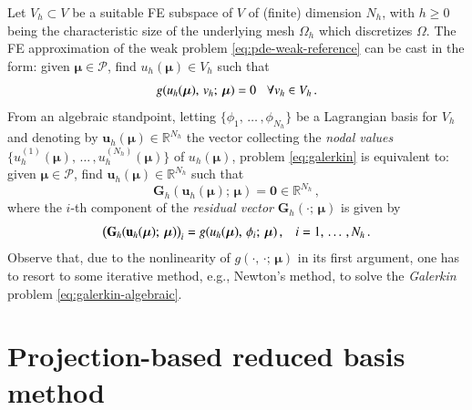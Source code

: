 \documentclass[longtitle]{elsarticle}
\numberwithin{equation}{section}
\theoremstyle{theorem}
\theoremstyle{definition}
\theoremstyle{remark}
\theoremstyle{proposition}
\numberwithin{figure}{section}
\newcommand{\bg}[1]{\boldsymbol{#1}}
\begin{document}
		Let $V_h \subset V$ be a suitable FE subspace of $V$ of (finite) dimension $N_h$, with $h \geq 0$ being the characteristic size of the underlying mesh $\Omega_h$ which discretizes $\Omega$. The FE approximation of the weak problem \eqref{eq:pde-weak-reference} can be cast in the form: given $\bg{\mu} \in \mathcal{P}$, find $u_h(\bg{\mu}) \in V_h$ such that 
		\begin{equation}
			\label{eq:galerkin}
			g(u_h(\bg{\mu}), \, v_h; \, \bg{\mu}) = 0 \hspace*{0.3cm} \forall v_h \in V_h \, .
		\end{equation}
		From an algebraic standpoint, letting $\big\lbrace \phi_1, \, \ldots \, , \phi_{N_h} \big\rbrace$ be a Lagrangian basis for $V_h$ and denoting by $\mathbf{u}_h(\bg{\mu}) \in \mathbb{R}^{N_h}$ the vector collecting the \emph{nodal values} $\big\lbrace u_h^{(1)}(\bg{\mu}), \, \ldots \, , u_h^{(N_h)}(\bg{\mu}) \big\rbrace$ of $u_h(\bg{\mu})$, problem \eqref{eq:galerkin} is equivalent to: given $\bg{\mu} \in \mathcal{P}$, find $\mathbf{u}_h(\bg{\mu}) \in \mathbb{R}^{N_h}$ such that
		\begin{equation}
			\label{eq:galerkin-algebraic}
			\mathbf{G}_h(\mathbf{u}_h(\bg{\mu}); \, \bg{\mu}) = \mathbf{0} \in \mathbb{R}^{N_h} \, ,
		\end{equation}
		where the $i$-th component of the \emph{residual vector} $\mathbf{G}_h(\cdot; \, \bg{\mu})$ is given by
		\begin{equation}
			\label{eq:galerkin-algebraic-component}
			\big( \mathbf{G}_h(\mathbf{u}_h(\bg{\mu}); \, \bg{\mu}) \big)_i = g(u_h(\bg{\mu}), \, \phi_i; \, \bg{\mu}) \, , \hspace*{0.3cm} i = 1, \, \ldots \, , N_h \, .
		\end{equation}
		Observe that, due to the nonlinearity of $g(\cdot, \, \cdot; \, \bg{\mu})$ in its first argument, one has to resort to some iterative method, e.g., Newton's method, to solve the \emph{Galerkin} problem \eqref{eq:galerkin-algebraic}. 		
		

	
	\section{Projection-based reduced basis method}
	\label{section:Projection-based reduced basis method}
	
\end{document}
